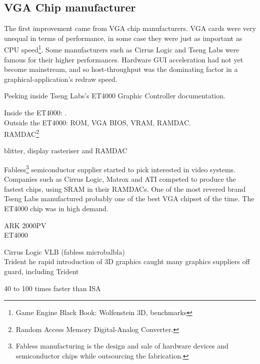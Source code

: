 \subsection{VGA Chip manufacturer}
The first improvement came from VGA chip manufacturers. VGA cards were very unequal in terms of performance, in some case they were just as important as CPU speed\footnote{Game Engine Black Book: Wolfenstein 3D, benchmarks}. Some manufacturers such as Cirrus Logic and Tseng Labs were famous for their higher performances. Hardware GUI acceleration had not yet become mainstream, and so host-throughput was the dominating factor in a graphical-application's redraw speed.\\
\par
Peeking inside Tseng Labs's ET4000 Graphic Controller documentation. 
\par
Inside the ET4000: .\\
Outside the ET4000: ROM, VGA BIOS, VRAM, RAMDAC.\\
RAMDAC\footnote{Random Access Memory Digital-Analog Converter.}
\par
blitter, display rasteriser and RAMDAC
\par





Fabless\footnote{Fabless manufacturing is the design and sale of hardware devices and semiconductor chips while outsourcing the fabrication.} semiconductor supplier started to pick interested in video systems. Companies such as Cirrus Logic, Matrox and ATI competed to produce the fastest chips, using SRAM in their RAMDACs. One of the most revered brand Tseng Labs manufactured probably one of the best VGA chipset of the time. The ET4000 chip was in high demand.\\
\par
{}

\par
ARK 2000PV\\
ET4000\\
\par
Cirrus Logic VLB (fabless microbalbla)\\
Trident he rapid introduction of 3D graphics caught many graphics suppliers off guard, including Trident\\
\par
40 to 100 times faster than ISA\\
\par



